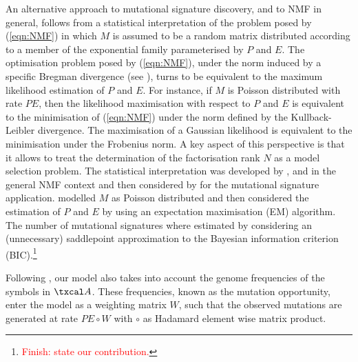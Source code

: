 \documentclass{bioinfo}
\begin{document}
An alternative approach to mutational signature discovery, and to NMF
in general, follows from a statistical interpretation of the problem
posed by (\ref{eqn:NMF}) in which $M$ is assumed to be a random matrix
distributed according to a member of the exponential family
parameterised by $P$ and $E$. The optimisation problem posed by
(\ref{eqn:NMF}), under the norm induced by a specific Bregman
divergence (see \citealp{BMD}), turns to be equivalent to the maximum
likelihood estimation of $P$ and $E$.  For instance, if $M$ is Poisson
distributed with rate $PE$, then the likelihood maximisation with
respect to $P$ and $E$ is equivalent to the minimisation of
(\ref{eqn:NMF}) under the norm defined by the Kullback-Leibler
divergence. The maximisation of a Gaussian likelihood is equivalent to
the minimisation under the Frobenius norm. A key aspect of this
perspective is that it allows to treat the determination of the
factorisation rank $N$ as a model selection problem. The statistical
interpretation was developed by \cite{C}, \cite{FC} and \cite{SWK} in
the general NMF context and then considered by \cite{FICMV} for the
mutational signature application. \cite{FICMV} modelled $M$ as Poisson
distributed and then considered the estimation of $P$ and $E$ by using
an expectation maximisation (EM) algorithm. The number of mutational
signatures where estimated by considering an (unnecessary) saddlepoint
approximation to the Bayesian information criterion
(BIC).\footnote{\textcolor{red}{Finish: state our contribution.}}


Following \cite{FICMV}, our model also takes into account the genome
frequencies of the symbols in $\txcal A$.  These frequencies, known as
the mutation opportunity, enter the model as a weighting matrix $W$, 
such  that the observed mutations are generated at rate $PE\circ W$
with $\circ$ as  Hadamard element wise matrix product.

\end{document}
